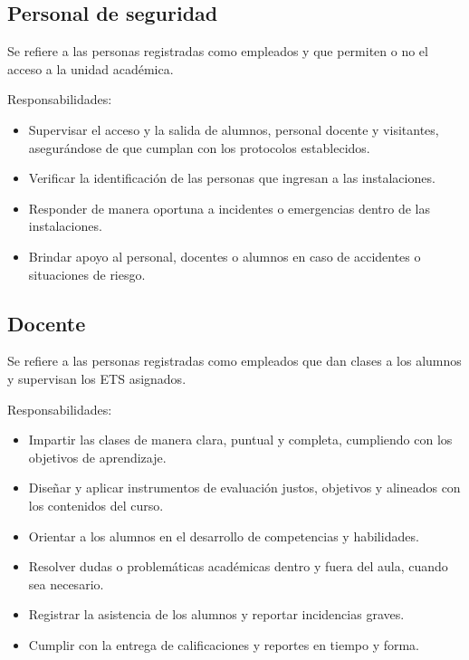 \begin{Usuario}{\hypertarget{tPersonalSeguridad}{\subsection{Personal de seguridad}}}{
		Se refiere a las personas registradas como empleados y que permiten o no el acceso a la unidad académica.
	}
	\item[Responsabilidades:] \cdtEmpty
	\begin{itemize}
		\item Supervisar el acceso y la salida de alumnos, personal docente y visitantes, asegurándose de que cumplan con los protocolos establecidos.
		\item Verificar la identificación de las personas que ingresan a las instalaciones.
		\item Responder de manera oportuna a incidentes o emergencias dentro de las instalaciones.
		\item Brindar apoyo al personal, docentes o alumnos en caso de accidentes o situaciones de riesgo.
	\end{itemize}
	

\end{Usuario}

\begin{Usuario}{\hypertarget{tDocenteAplicador}{\subsection{Docente}}}{
		Se refiere a las personas registradas como empleados que dan clases a los alumnos y supervisan los ETS asignados.
	}
	\item[Responsabilidades:] \cdtEmpty
	\begin{itemize}
		\item Impartir las clases de manera clara, puntual y completa, cumpliendo con los objetivos de aprendizaje.
		\item Diseñar y aplicar instrumentos de evaluación justos, objetivos y alineados con los contenidos del curso.
		\item Orientar a los alumnos en el desarrollo de competencias y habilidades.
		\item Resolver dudas o problemáticas académicas dentro y fuera del aula, cuando sea necesario.
		\item Registrar la asistencia de los alumnos y reportar incidencias graves.
		\item Cumplir con la entrega de calificaciones y reportes en tiempo y forma.

	\end{itemize}
	

\end{Usuario}

